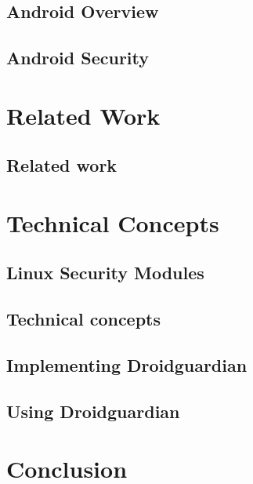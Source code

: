 \documentclass[
  oneside,
  11pt, a4paper,
  footinclude=true,
  headinclude=true,
  cleardoublepage=empty
]{scrbook}
\begin{document}
\chapter{Android Overview}
\label{chap:android_overview}


\chapter{Android Security}
\label{chap:android_security}


\part{Related Work}

\chapter{Related work}
\label{chap:background}


\part{Technical Concepts}

\chapter{Linux Security Modules}
\label{chap:lsm}


\chapter{Technical concepts}
\label{chap:technical_concepts}


\chapter{Implementing Droidguardian}
\label{chap:implementing_dg}


\chapter{Using Droidguardian}
\label{chap:using_dg}


\part{Conclusion}
\end{document}
